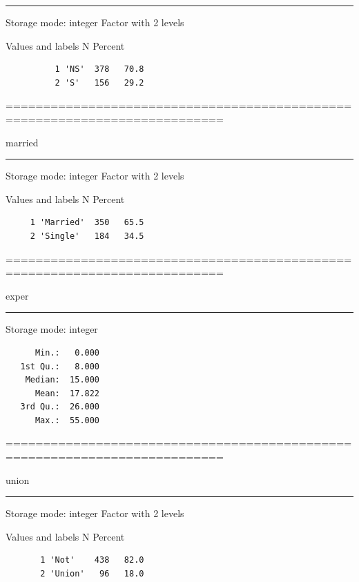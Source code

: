 \documentclass[]{article}
\begin{document}
\begin{center}\rule{0.5\linewidth}{\linethickness}\end{center}

Storage mode: integer Factor with 2 levels

Values and labels N Percent

\begin{verbatim}
          1 'NS'  378   70.8     
          2 'S'   156   29.2     
\end{verbatim}

===========================================================================

married

\begin{center}\rule{0.5\linewidth}{\linethickness}\end{center}

Storage mode: integer Factor with 2 levels

Values and labels N Percent

\begin{verbatim}
     1 'Married'  350   65.5     
     2 'Single'   184   34.5     
\end{verbatim}

===========================================================================

exper

\begin{center}\rule{0.5\linewidth}{\linethickness}\end{center}

Storage mode: integer

\begin{verbatim}
      Min.:   0.000
   1st Qu.:   8.000
    Median:  15.000
      Mean:  17.822
   3rd Qu.:  26.000
      Max.:  55.000
\end{verbatim}

===========================================================================

union

\begin{center}\rule{0.5\linewidth}{\linethickness}\end{center}

Storage mode: integer Factor with 2 levels

Values and labels N Percent

\begin{verbatim}
       1 'Not'    438   82.0     
       2 'Union'   96   18.0     
\end{verbatim}
\end{document}
